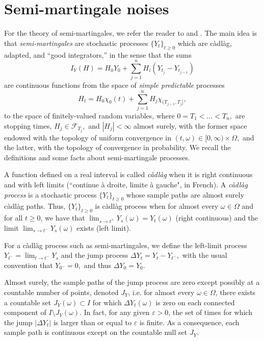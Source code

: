 \documentclass[reqno,12pt]{amsart}
\theoremstyle{plain} %
\theoremstyle{definition} %
\begin{document}
\section{Semi-martingale noises}
\label{secsemimartingale}

For the theory of semi-martingales, we refer the reader to \cite{Protter2005} and \cite{Metivier1982}. The main idea is that \emph{semi-martingales} are stochastic processes $\{Y_t\}_{t\geq 0}$ which are c\`adl\`ag, adapted, and ``good integrators,'' in the sense that the sums
\[
    I_Y(H) = H_0 Y_0 + \sum_{j=1}^n H_i(Y_{t_j}-Y_{t_{j-1}})
\]
are continuous functions from the space of \emph{simple predictable} processes
\[
    H_t = H_0 \chi_{0}(t) + \sum_{j=1}^n H_j \chi_{(T_{j-1}, T_j]},
\]
to the space of finitely-valued random variables, where $0=T_1 < \ldots < T_n,$ are stopping times, $H_j \in \mathcal{F}_{T_j},$ and $|H_j| < \infty$ almost surely, with the former space endowed with the topology of uniform convergence in $(t, \omega)\in [0,\infty)\times \Omega,$ and the latter, with the topology of convergence in probability. We recall the definitions and some facts about semi-martingale processes.

A function defined on a real interval is called \emph{c\`adl\`ag} when it is right continuous and with left limits (``continue \`a droite, limite \`a gauche", in French). A \emph{c\`adl\`ag process} is a stochastic process $\{Y_t\}_{t\geq 0}$ whose sample paths are almost surely c\`adl\`ag paths. Thus, $\{Y_t\}_{t\geq 0}$ is c\`adl\`ag process when for almost every $\omega\in \Omega$ and for all $t\geq 0$, we have that $\lim_{s\rightarrow t^+} Y_s(\omega) = Y_t(\omega)$ (right continuous) and the limit $\lim_{s \rightarrow t^-} Y_s(\omega)$ exists (left limit).

For a c\`adl\`ag process such as semi-martingales, we define the left-limit process $Y_{t^{-}} = \lim_{t \rightarrow t^-} Y_s$ and the jump process $\Delta Y_t = Y_t - Y_{t^{-}},$ with the usual convention that $Y_{0^-} = 0,$ and thus $\Delta Y_0 = Y_0.$

Almost surely, the sample paths of the jump process are zero except possibly at a countable number of points, denoted $J_{Y}$, i.e. for almost every $\omega\in \Omega$, there exists a countable set $J_{Y}(\omega) \subset I$ for which $\Delta Y_t(\omega)$ is zero on each connected component of $I\setminus J_{Y}(\omega)$. In fact, for any given $\varepsilon > 0$, the set of times for which the jump $|\Delta Y_t|$ is larger than or equal to $\varepsilon$ is finite. As a consequence, each sample path is continuous except on the countable null set $J_{Y}.$
\end{document}
